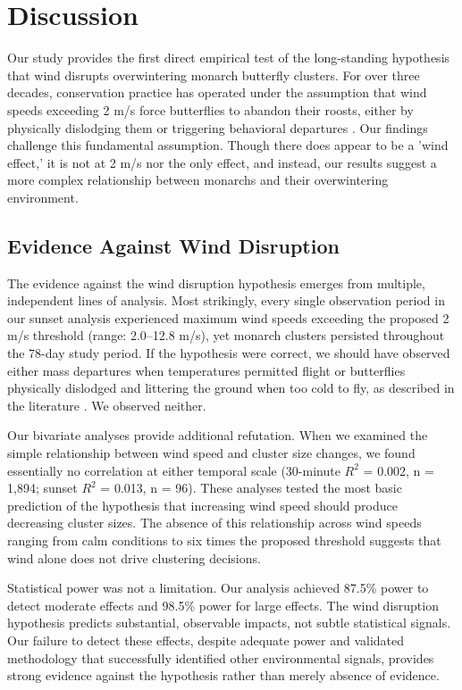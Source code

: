 \section{Discussion}

Our study provides the first direct empirical test of the long-standing hypothesis that wind disrupts overwintering monarch butterfly clusters. For over three decades, conservation practice has operated under the assumption that wind speeds exceeding 2 m/s force butterflies to abandon their roosts, either by physically dislodging them or triggering behavioral departures \parencite{leongEvaluationManagementCalifornia2016}. Our findings challenge this fundamental assumption. Though there does appear to be a 'wind effect,' it is not at 2 m/s nor the only effect, and instead, our results suggest a more complex relationship between monarchs and their overwintering environment.

\subsection{Evidence Against Wind Disruption}

The evidence against the wind disruption hypothesis emerges from multiple, independent lines of analysis. Most strikingly, every single observation period in our sunset analysis experienced maximum wind speeds exceeding the proposed 2 m/s threshold (range: 2.0--12.8 m/s), yet monarch clusters persisted throughout the 78-day study period. If the hypothesis were correct, we should have observed either mass departures when temperatures permitted flight or butterflies physically dislodged and littering the ground when too cold to fly, as described in the literature \parencite{leongRestorationOverwinteringGrove1999}. We observed neither.

Our bivariate analyses provide additional refutation. When we examined the simple relationship between wind speed and cluster size changes, we found essentially no correlation at either temporal scale (30-minute $R^2$ = 0.002, n = 1,894; sunset $R^2$ = 0.013, n = 96). These analyses tested the most basic prediction of the hypothesis that increasing wind speed should produce decreasing cluster sizes. The absence of this relationship across wind speeds ranging from calm conditions to six times the proposed threshold suggests that wind alone does not drive clustering decisions.

Statistical power was not a limitation. Our analysis achieved 87.5\% power to detect moderate effects and 98.5\% power for large effects. The wind disruption hypothesis predicts substantial, observable impacts, not subtle statistical signals. Our failure to detect these effects, despite adequate power and validated methodology that successfully identified other environmental signals, provides strong evidence against the hypothesis rather than merely absence of evidence.

